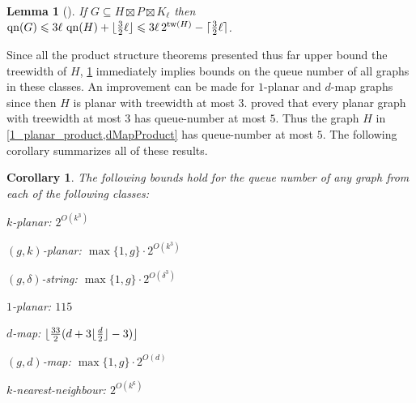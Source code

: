 \documentclass{patmorin}
\theoremstyle{plain}
\newtheorem{lem}[thm]{Lemma}
\newtheorem{cor}[thm]{Corollary}
\theoremstyle{definition}
\newcommand{\note}[2]{\noindent{\color{red}[#1:~#2]}}
\DeclareMathOperator{\tw}{tw}
\DeclareMathOperator{\qn}{qn}
\DeclarePairedDelimiter{\ceil}{\lceil}{\rceil}
\DeclarePairedDelimiter{\floor}{\lfloor}{\rfloor}
\renewcommand{\leq}{\leqslant}
\begin{document}
\begin{lem}[\citep{DJMMUW20}]
\label{qn}
If $G\subseteq H \boxtimes P \boxtimes K_\ell$ then
$\qn(G) \leq  3 \ell \, \qn(H) + \floor{\tfrac{3}{2}\ell}
\leq 3 \ell \, 2^{\tw(H)}  - \ceil{\tfrac{3}{2}\ell}$.
\end{lem}

Since all the product structure theorems presented thus far upper bound the treewidth of $H$, \cref{qn} immediately implies bounds on the queue number of all graphs in these classes.  An improvement can be made for $1$-planar and $d$-map graphs since then $H$ is planar with treewidth at most $3$. \citet{ABGKP20} proved that every planar graph with treewidth at most $3$ has queue-number at most $5$. Thus the graph $H$ in \cref{1_planar_product,dMapProduct} has queue-number at most $5$.
%
%
%
%
%
The following corollary summarizes all of these results.
\begin{cor}\label{q_cor}
  The following bounds hold for the queue number of any graph from each of the following classes:
  \begin{compactitem}
    \item $k$-planar: $2^{O(k^3)}$
    \item $(g,k)$-planar: $\max\{1,g\}\cdot 2^{O(k^3)}$
    \item $(g,\delta)$-string: $\max\{1,g\}\cdot 2^{O(\delta^3)}$
    \item $1$-planar: $115$
    \item $d$-map: $\floor{ \frac{33}{2} (d+3\floor{\frac{d}{2}}-3) }$
    \item $(g,d)$-map: $\max\{1,g\}\cdot 2^{O(d)}$
    \item $k$-nearest-neighbour: $2^{O(k^6)}$
  \end{compactitem}
\end{cor}
\end{document}
